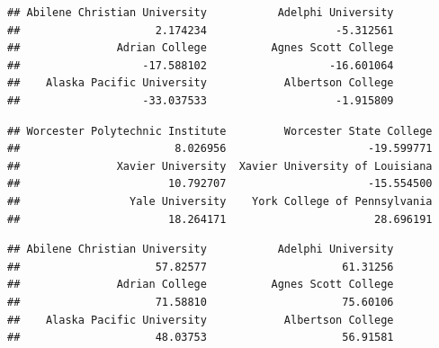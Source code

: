 \documentclass[
]{article}
\newenvironment{Shaded}{\begin{snugshade}}{\end{snugshade}}
\newcommand{\DocumentationTok}[1]{\textcolor[rgb]{0.56,0.35,0.01}{\textbf{\textit{#1}}}}
\newcommand{\FunctionTok}[1]{\textcolor[rgb]{0.13,0.29,0.53}{\textbf{#1}}}
\newcommand{\NormalTok}[1]{#1}
\newcommand{\SpecialCharTok}[1]{\textcolor[rgb]{0.81,0.36,0.00}{\textbf{#1}}}
\begin{document}
\begin{Shaded}
\end{Shaded}

\begin{verbatim}
## Abilene Christian University           Adelphi University 
##                     2.174234                    -5.312561 
##               Adrian College          Agnes Scott College 
##                   -17.588102                   -16.601064 
##    Alaska Pacific University            Albertson College 
##                   -33.037533                    -1.915809
\end{verbatim}

\begin{Shaded}
\end{Shaded}

\begin{verbatim}
## Worcester Polytechnic Institute         Worcester State College 
##                        8.026956                      -19.599771 
##               Xavier University  Xavier University of Louisiana 
##                       10.792707                      -15.554500 
##                 Yale University    York College of Pennsylvania 
##                       18.264171                       28.696191
\end{verbatim}

\begin{Shaded}
\end{Shaded}

\begin{Shaded}
\end{Shaded}

\begin{verbatim}
## Abilene Christian University           Adelphi University 
##                     57.82577                     61.31256 
##               Adrian College          Agnes Scott College 
##                     71.58810                     75.60106 
##    Alaska Pacific University            Albertson College 
##                     48.03753                     56.91581
\end{verbatim}
\end{document}
